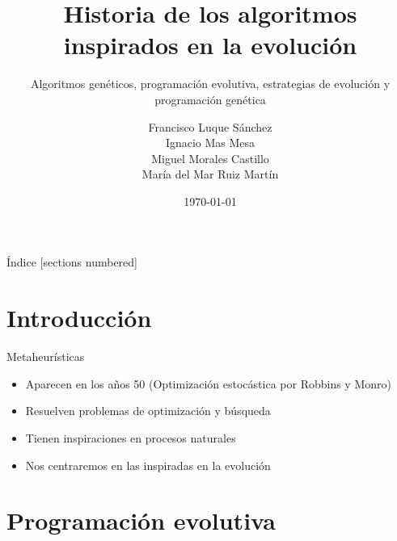 \documentclass[10pt]{beamer}
\title{Historia de los algoritmos inspirados en la evolución}
\subtitle{Algoritmos genéticos, programación evolutiva, estrategias de evolución y programación genética}
\date{\today}
\author{
  Francisco Luque Sánchez \\
  Ignacio Mas Mesa \\
  Miguel Morales Castillo \\
  María del Mar Ruiz Martín
}
\institute{Universidad de Granada}
\begin{document}
\maketitle

\begin{frame}{Índice}
  [sections numbered]
  \tableofcontents[hideallsubsections]
\end{frame}

\section{Introducción}

\begin{frame}[fragile]{Metaheurísticas}
  \begin{itemize}
  \item Aparecen en los años 50 (Optimización estocástica por Robbins y Monro) \\
  \item Resuelven problemas de optimización y búsqueda \\
  \item Tienen inspiraciones en procesos naturales \\
  \item Nos centraremos en las inspiradas en la evolución
  \end{itemize}
\end{frame}

\section{Programación evolutiva}
\end{document}

